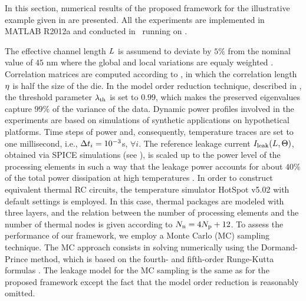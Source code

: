 In this section, numerical results of the proposed framework for the illustrative example given in  are presented. All the experiments are implemented in MATLAB R2012a \cite{matlab} and conducted in \hostOS\ running on \hostHardware.

The effective channel length $L$ is assumend to deviate by $5\%$ from the nominal value of $45$ nm where the global and local variations are equaly weighted \cite{juan2011, juan2012}. Correlation matrices are computed according to , in which the correlation length $\eta$ is half the size of the die. In the model order reduction technique, described in , the threshold parameter $\lambda_\text{th}$ is set to $0.99$, which makes the preserved eigenvalues capture $99\%$ of the variance of the data. Dynamic power profiles involved in the experiments are based on simulations of synthetic applications on hypothetical platforms. Time steps of power and, consequently, temperature traces are set to one millisecond, i.e., $\Delta t_i = 10^{-3}$s, $\forall i$. The reference leakage current $I_{\text{leak}}(L, \Theta)$, obtained via SPICE simulations (see ), is scaled up to the power level of the processing elements in such a way that the leakage power accounts for about $40\%$ of the total power dissipation at high temperatures \cite{liu2007}. In order to construct equivalent thermal RC circuits, the temperature simulator HotSpot v5.02 \cite{hotspot} with default settings is employed. In this case, thermal packages are modeled with three layers, and the relation between the number of processing elements and the number of thermal nodes is given according to $N_\text{n} = 4 {N_\text{p}} + 12$. To assess the performance of our framework, we employ a Monte Carlo (MC) sampling technique. The MC approach consists in solving  numerically using the Dormand-Prince method, which is based on the fourth- and fifth-order Runge-Kutta formulas \cite{press2007}. The leakage model for the MC sampling is the same as for the proposed framework except the fact that the model order reduction is reasonably omitted.

